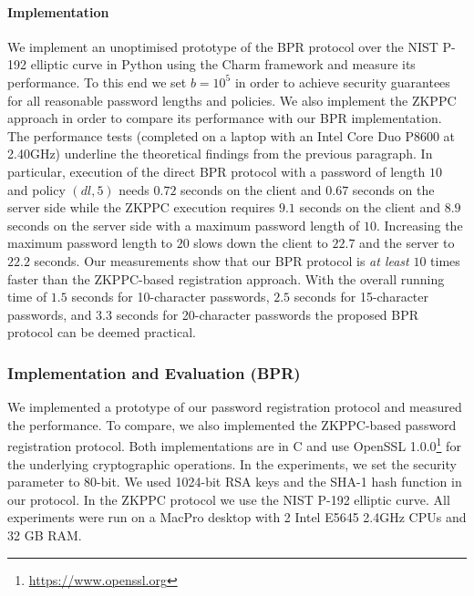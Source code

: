 \paragraph{Implementation}
We implement an unoptimised prototype of the \ac{BPR} protocol over the \ac{NIST} P-192 elliptic curve \cite{nistEC} in Python using the Charm framework \cite{charm13} and measure its performance.
To this end we set $b=10^5$ in order to achieve security guarantees for all reasonable password lengths and policies.
We also implement the \ac{ZKPPC} approach in order to compare its performance with our BPR implementation.
The performance tests (completed on a laptop with an Intel Core Duo P8600 at 2.40GHz) underline the theoretical findings from the previous paragraph. 
In particular, execution of the direct \ac{BPR} protocol with a password of length $10$ and policy $(dl, 5)$ needs $0.72$ seconds on the client and $0.67$ seconds on the server side while the \ac{ZKPPC} execution requires $9.1$ seconds on the client and $8.9$ seconds on the server side with a maximum password length of $10$.
Increasing the maximum password length to $20$ slows down the client to $22.7$ and the server to $22.2$ seconds.
Our measurements show that our \ac{BPR} protocol is \emph{at least} $10$ times faster than the \ac{ZKPPC}-based registration approach.
With the overall running time of $1.5$ seconds for 10-character passwords, $2.5$ seconds for 15-character passwords, and $3.3$ seconds for 20-character passwords the proposed \ac{BPR} protocol can be deemed practical.

\subsubsection{Implementation and Evaluation (BPR)}\label{sec:evaluation}
We implemented a prototype of our password registration protocol and measured the performance. 
To compare, we also implemented the \ac{ZKPPC}-based password registration protocol. 
Both implementations are in C and use OpenSSL 1.0.0\footnote{\url{https://www.openssl.org}} for the underlying cryptographic operations. 
In the experiments, we set the security parameter to 80-bit. We used 1024-bit RSA keys and the \mbox{{SHA-}1} hash function in our protocol. 
In the \ac{ZKPPC} protocol we use the \ac{NIST} P-192 elliptic curve. 
All experiments were run on a MacPro desktop with 2 Intel E5645 2.4GHz CPUs and 32 GB RAM.

